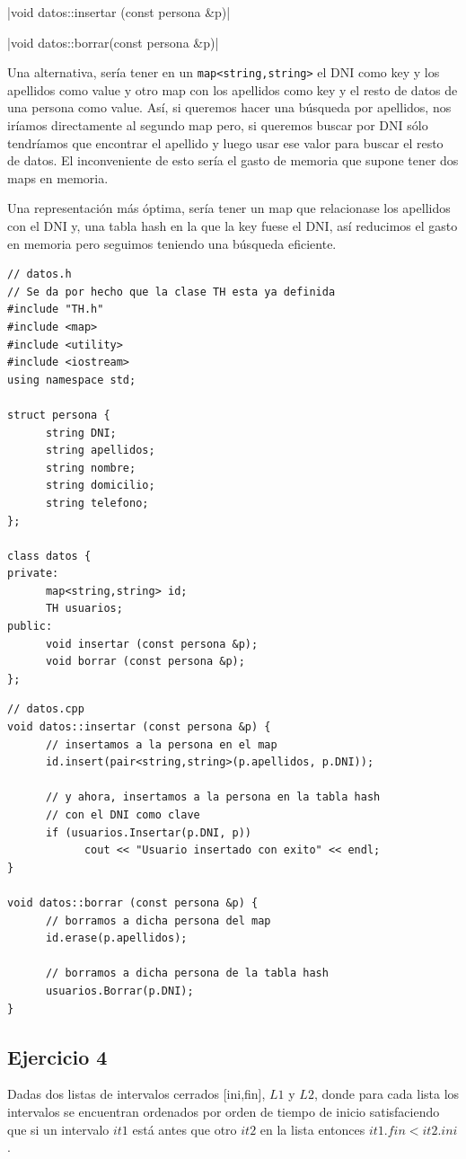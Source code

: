 \documentclass[10pt,a4paper,spanish]{report}
\begin{document}
|void datos::insertar (const persona &p)|

|void datos::borrar(const persona &p)|

\noindent
Una alternativa, sería tener en un \verb*|map<string,string>| el DNI como key y los apellidos como value y otro map con los apellidos como key y el resto de datos de una persona como value. Así, si queremos hacer una búsqueda por apellidos, nos iríamos directamente al segundo map pero, si queremos buscar por DNI sólo tendríamos que encontrar el apellido y luego usar ese valor para buscar el resto de datos. El inconveniente de esto sería el gasto de memoria que supone tener dos maps en memoria.

\noindent
Una representación más óptima, sería tener un map que relacionase los apellidos con el DNI y, una tabla hash en la que la key fuese el DNI, así reducimos el gasto en memoria pero seguimos teniendo una búsqueda eficiente.

\begin{verbatim}
// datos.h
// Se da por hecho que la clase TH esta ya definida
#include "TH.h"
#include <map>
#include <utility>
#include <iostream>
using namespace std;

struct persona {
      string DNI;
      string apellidos;
      string nombre;
      string domicilio;
      string telefono;
};

class datos {
private:
      map<string,string> id;
      TH usuarios;
public:
      void insertar (const persona &p);
      void borrar (const persona &p);
};
\end{verbatim}

\begin{verbatim}
// datos.cpp
void datos::insertar (const persona &p) {
      // insertamos a la persona en el map
      id.insert(pair<string,string>(p.apellidos, p.DNI));

      // y ahora, insertamos a la persona en la tabla hash
      // con el DNI como clave
      if (usuarios.Insertar(p.DNI, p))
            cout << "Usuario insertado con exito" << endl;
}

void datos::borrar (const persona &p) {
      // borramos a dicha persona del map
      id.erase(p.apellidos);

      // borramos a dicha persona de la tabla hash
      usuarios.Borrar(p.DNI);
}
\end{verbatim}

\subsection{\textcolor[rgb]{0.5,0.8,1}Ejercicio 4}
\noindent
Dadas dos listas de intervalos cerrados [ini,fin], $L1$ y $L2$, donde para cada lista los intervalos se encuentran ordenados por orden de tiempo de inicio satisfaciendo que si un intervalo $it1$ está antes que otro $it2$ en la lista entonces $it1.fin < it2.ini$.
\end{document}
